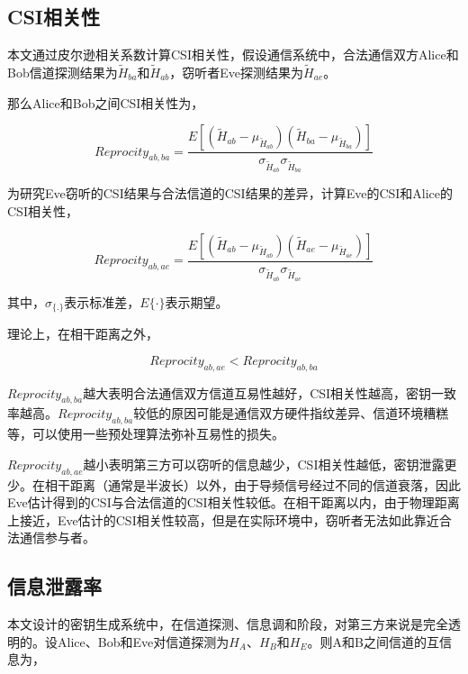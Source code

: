 \documentclass[master]{seuthesis} %
\begin{document}
\begin{Main}
\subsection{CSI相关性}

本文通过皮尔逊相关系数计算CSI相关性，假设通信系统中，合法通信双方Alice和Bob信道探测结果为$\tilde{H}_{ba}$和$\tilde{H}_{ab}$，窃听者Eve探测结果为$\tilde{H}_{ae}$。

那么Alice和Bob之间CSI相关性为，

\begin{equation}\label{equation_corr}
    Reprocity_{ab, ba} = \frac{E[(\tilde{H}_{ab}-\mu_{\tilde{H}_{ab}})(\tilde{H}_{ba}-\mu_{\tilde{H}_{ba}})]}{\sigma_{\tilde{H}_{ab}}\sigma_{\tilde{H}_{ba}}}
\end{equation}

为研究Eve窃听的CSI结果与合法信道的CSI结果的差异，计算Eve的CSI和Alice的CSI相关性，

\begin{equation}\label{equation_corr}
    Reprocity_{ab, ae} = \frac{E[(\tilde{H}_{ab}-\mu_{\tilde{H}_{ab}})(\tilde{H}_{ae}-\mu_{\tilde{H}_{ae}})]}{\sigma_{\tilde{H}_{ab}}\sigma_{\tilde{H}_{ae}}}
\end{equation}

其中，$\sigma_{\{.\}}$表示标准差，$E\{\cdot\}$表示期望。

理论上，在相干距离之外，

\begin{equation}
    Reprocity_{ab, ae} < Reprocity_{ab, ba}
\end{equation}

$Reprocity_{ab, ba}$越大表明合法通信双方信道互易性越好，CSI相关性越高，密钥一致率越高。$Reprocity_{ab, ba}$较低的原因可能是通信双方硬件指纹差异、信道环境糟糕等，可以使用一些预处理算法弥补互易性的损失。

$Reprocity_{ab, ae}$越小表明第三方可以窃听的信息越少，CSI相关性越低，密钥泄露更少。在相干距离（通常是半波长）以外，由于导频信号经过不同的信道衰落，因此Eve估计得到的CSI与合法信道的CSI相关性较低。在相干距离以内，由于物理距离上接近，Eve估计的CSI相关性较高，但是在实际环境中，窃听者无法如此靠近合法通信参与者。

\subsection{信息泄露率}

本文设计的密钥生成系统中，在信道探测、信息调和阶段，对第三方来说是完全透明的\cite{sahin2016secure}。设Alice、Bob和Eve对信道探测为$H_A$、$H_B$和$H_E$。则A和B之间信道的互信息为，


\end{Main}
\end{document}
